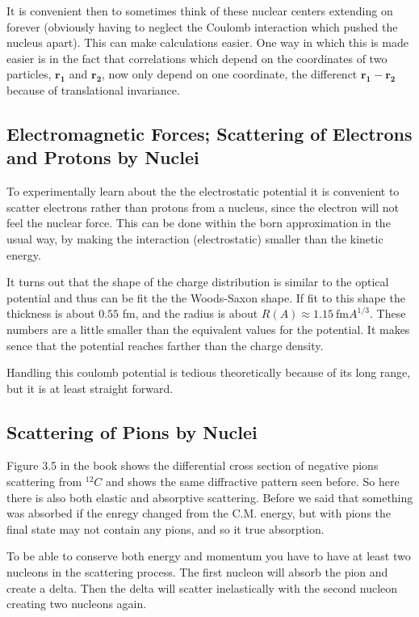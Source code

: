 \documentclass[12pt]{extarticle}
\begin{document}
It is convenient then to sometimes think of these nuclear centers extending on forever (obviously having to neglect the Coulomb interaction which pushed the nucleus apart). This can make calculations easier. One way in which this is made easier is in the fact that correlations which depend on the coordinates of two particles, $\mathbf{r_1}$ and $\mathbf{r_2}$, now only depend on one coordinate, the differenct $\mathbf{r_1}-\mathbf{r_2}$ because of translational invariance.

\subsection{Electromagnetic Forces; Scattering of Electrons and Protons by Nuclei}
To experimentally learn about the the electrostatic potential it is convenient to scatter electrons rather than protons from a nucleus, since the electron will not feel the nuclear force. This can be done within the born approximation in the usual way, by making the interaction (electrostatic) smaller than the kinetic energy.

It turns out that the shape of the charge distribution is similar to the optical potential and thus can be fit the the Woods-Saxon shape. If fit to this shape the thickness is about $0.55$ fm, and the radius is about $R(A) \approx 1.15 ~\mathrm{fm}A^{1/3}$. These numbers are a little smaller than the equivalent values for the potential. It makes sence that the potential reaches farther than the charge density.

Handling this coulomb potential is tedious theoretically because of its long range, but it is at least straight forward.

\subsection{Scattering of Pions by Nuclei}
Figure 3.5 in the book shows the differential cross section of negative pions scattering from ${}^{12}C$ and shows the same diffractive pattern seen before. So here there is also both elastic and absorptive scattering. Before we said that something was absorbed if the enregy changed from the C.M. energy, but with pions the final state may not contain any pions, and so it true absorption.

To be able to conserve both energy and momentum you have to have at least two nucleons in the scattering process. The first nucleon will absorb the pion and create a delta. Then the delta will scatter inelastically with the second nucleon creating two nucleons again.
\end{document}
